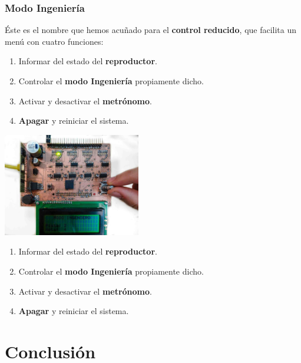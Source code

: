 \documentclass[10pt,a4paper]{article}
\begin{document}
	\subsubsection*{Modo Ingeniería}
	
	Éste es el nombre que hemos acuñado para el \textbf{control reducido}, que facilita un menú con cuatro funciones:
	
	\begin{multicols}{2}
		\begin{enumerate}
			\item Informar del estado del \textbf{reproductor}.
			\item Controlar el \textbf{modo Ingeniería} propiamente dicho.
			\item Activar y desactivar el \textbf{metrónomo}.
			\item \textbf{Apagar} y reiniciar el sistema.
		\end{enumerate}
		\columnbreak
		\noindent
		\begin{center}
			\includegraphics[width=0.45\textwidth]{images/pcb_ingeniero} 
		\end{center}
		
	\end{multicols}
	
	\begin{enumerate}
		\item Informar del estado del \textbf{reproductor}.
		\item Controlar el \textbf{modo Ingeniería} propiamente dicho.
		\item Activar y desactivar el \textbf{metrónomo}.
		\item \textbf{Apagar} y reiniciar el sistema.
	\end{enumerate}
	
		
	\section{Conclusión}
	
\end{document}
